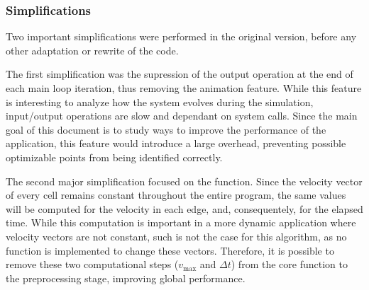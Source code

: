 \subsubsection{Simplifications}
\label{sec:311}


Two important simplifications were performed in the original version, before any other adaptation or rewrite of the code.

The first simplification was the supression of the output operation at the end of each main loop iteration, thus removing the animation feature. While this feature is interesting to analyze how the system evolves during the simulation, input/output operations are slow and dependant on system calls.
Since the main goal of this document is to study ways to improve the performance of the \polu application, this feature would introduce a large overhead, preventing possible optimizable points from being identified correctly.

The second major simplification focused on the \computeflux function.
Since the velocity vector of every cell remains constant throughout the entire program, the same values will be computed for the velocity in each edge, and, consequentely, for the elapsed time.
While this computation is important in a more dynamic application where velocity vectors are not constant, such is not the case for this algorithm, as no function is implemented to change these vectors.
Therefore, it is possible to remove these two computational steps ($v_{\mathrm{max}}$ and $\Delta t$) from the core function to the preprocessing stage, improving global performance.
